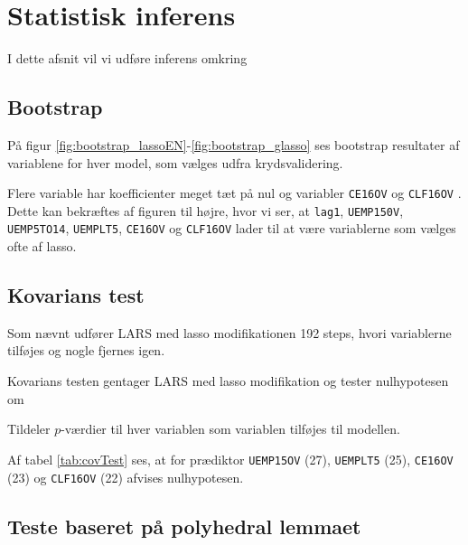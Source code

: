 \section{Statistisk inferens}
I dette afsnit vil vi udføre inferens omkring


\subsection{Bootstrap}
På figur \ref{fig:bootstrap_lassoEN}-\ref{fig:bootstrap_glasso} ses bootstrap resultater af variablene for hver model, som vælges udfra krydsvalidering.

Flere variable har koefficienter meget tæt på nul og 
variabler \texttt{CE16OV} og \texttt{CLF16OV} .
Dette kan bekræftes af figuren til højre, hvor vi ser, at \texttt{lag1}, \texttt{UEMP150V}, \texttt{UEMP5TO14}, \texttt{UEMPLT5}, \texttt{CE16OV} og \texttt{CLF16OV} lader til at være variablerne som vælges ofte af lasso.
%
%
%



\newpage
\subsection{Kovarians test}
Som nævnt udfører LARS med lasso modifikationen 192 steps, hvori variablerne tilføjes og nogle fjernes igen.

Kovarians testen gentager LARS med lasso modifikation og tester nulhypotesen om 

Tildeler \(p\)-værdier til hver variablen som variablen tilføjes til modellen.


Af tabel \ref{tab:covTest} ses, at for prædiktor \texttt{UEMP15OV} (27), \texttt{UEMPLT5} (25), \texttt{CE16OV} (23) og \texttt{CLF16OV} (22) afvises nulhypotesen.




\newpage
\subsection{Teste baseret på polyhedral lemmaet}

